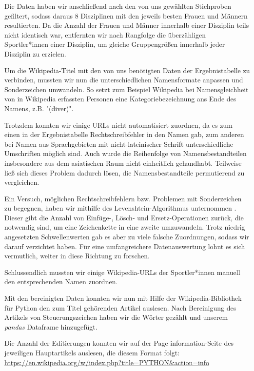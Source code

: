 \documentclass[11pt]{article}
\begin{document}
Die Daten haben wir anschließend nach den von uns gewählten Stichproben gefiltert, sodass daraus 8 Disziplinen mit den jeweils besten Frauen und Männern resultierten. Da die Anzahl der Frauen und Männer innerhalb einer Disziplin teils nicht identisch war, entfernten wir nach Rangfolge die überzähligen Sportler*innen einer Disziplin, um gleiche Gruppengrößen innerhalb jeder Disziplin zu erzielen.

Um die Wikipedia-Titel mit den von uns benötigten Daten der Ergebnistabelle zu verbinden, mussten wir nun die unterschiedlichen Namensformate anpassen und Sonderzeichen umwandeln. So setzt zum Beispiel Wikipedia bei Namensgleichheit von in Wikipedia erfassten Personen eine Kategoriebezeichnung ans Ende des Namens, z.B. "(diver)".

Trotzdem konnten wir einige URLs nicht automatisiert zuordnen, da es zum einen in der Ergebnistabelle Rechtschreibfehler in den Namen gab, zum anderen bei Namen aus Sprachgebieten mit nicht-lateinischer Schrift unterschiedliche Umschriften möglich sind. Auch wurde die Reihenfolge von Namensbestandteilen insbesondere aus dem asiatischen Raum nicht einheitlich gehandhabt. Teilweise ließ sich dieses Problem dadurch lösen, die Namensbestandteile permutierend zu vergleichen.

Ein Versuch, möglichen Rechtschreibfehlern bzw. Problemen mit Sonderzeichen zu begegnen, haben wir mithilfe des Levenshtein-Algorithmus unternommen \parencite{Sulzberger2019}. Dieser gibt die Anzahl von Einfüge-, Lösch- und Ersetz-Operationen zurück, die notwendig sind, um eine Zeichenkette in eine zweite umzuwandeln. Trotz niedrig angesetzten Schwellenwerten gab es aber zu viele falsche Zuordnungen, sodass wir darauf verzichtet haben. Für eine umfangreichere Datenauswertung lohnt es sich vermutlich, weiter in diese Richtung zu forschen.

Schlussendlich mussten wir einige Wikipedia-URLs der Sportler*innen manuell den entsprechenden Namen zuordnen.

Mit den bereinigten Daten konnten wir nun mit Hilfe der Wikipedia-Bibliothek für Python \cite{goldsmith} den zum Titel gehörenden Artikel auslesen. Nach Bereinigung des Artikels von Steuerungszeichen haben wir die Wörter gezählt und unserem \textit{pandas} Dataframe hinzugefügt.

Die Anzahl der Editierungen konnten wir auf der Page information-Seite des jeweiligen Hauptartikels auslesen, die diesem Format folgt:
\url{https://en.wikipedia.org/w/index.php?title=PYTHON&action=info}
\end{document}
